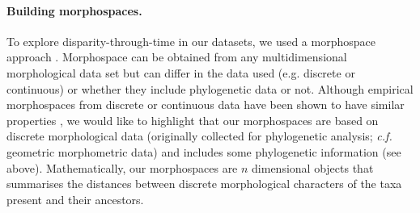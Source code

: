 \documentclass[12pt,a4paper]{article}
\begin{document}
\paragraph{Building morphospaces.} 



To explore disparity-through-time in our datasets, we used a morphospace approach \citep[e.g.][]{Foote01071994,Foote29111996,Wesley-Hunt2005,Brusatte12092008,friedmanexplosive2010,toljagictriassic-jurassic2013,Hughes20082013}.
Morphospace can be obtained from any multidimensional morphological data set but can differ in the data used (e.g. discrete or continuous) or whether they include phylogenetic data or not.
Although empirical morphospaces from discrete or continuous data have been shown to have similar properties \citep{foth2012different,hetherington2015cladistic}, we would like to highlight that our morphospaces are based on discrete morphological data (originally collected for phylogenetic analysis; \textit{c.f.} geometric morphometric data) and includes some phylogenetic information (see above).
Mathematically, our morphospaces are $n$ dimensional objects that summarises the distances between discrete morphological characters of the taxa present and their ancestors.
\end{document}
